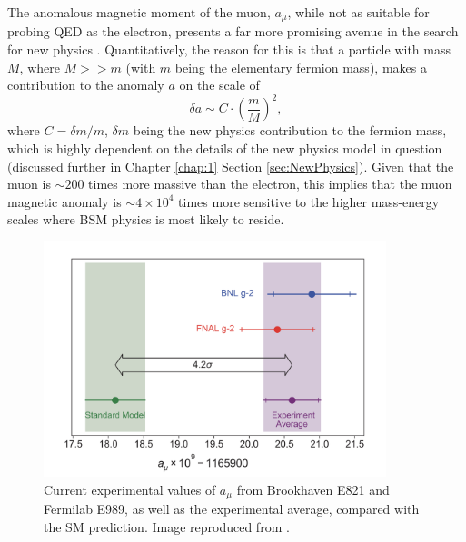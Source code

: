 The anomalous magnetic moment of the muon, $a_{\mu}$, while not as suitable for probing QED as the electron, presents a far more promising avenue in the search for new physics \cite{TheMuonAnomalyAndNewPhysics}. Quantitatively, the reason for this is that a particle with mass $M$, where $M>>m$ (with $m$ being the elementary fermion mass), makes a contribution to the anomaly $a$ on the scale of 
%
\begin{equation}
  \delta a \sim C\cdot\left(\frac{m}{M}\right)^{2}, 
  \label{eqn:NewPhysicsScale}
\end{equation}
%
where $C=\delta m/m$, $\delta m$ being the new physics contribution to the fermion mass, which is highly dependent on the details of the new physics model in question (discussed further in Chapter \ref{chap:1} Section \ref{sec:NewPhysics}). Given that the muon is $\sim200$ times more massive than the electron, this implies that the muon magnetic anomaly is $\sim4\times10^{4}$ times more sensitive to the higher mass-energy scales where BSM physics is most likely to reside.
%
\begin{figure}[t!]
\centering{}
\includegraphics[trim={0 0 0 0},clip,width=0.89\textwidth]{Images/Chapter1/ResultPlotRun1.png}
\caption{Current experimental values of $a_{\mu}$ from Brookhaven E821 and Fermilab E989, as well as the experimental average, compared with the SM prediction. Image reproduced from \cite{SummaryRun1}.}
\label{fig:Run1Result}
\end{figure}
%

